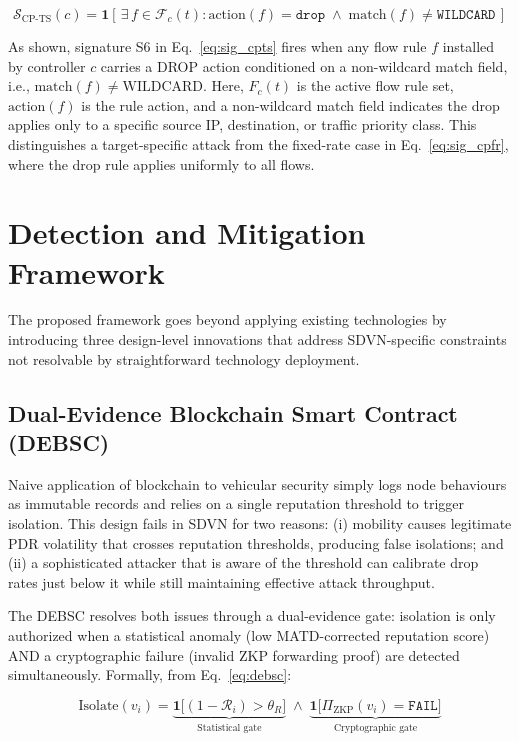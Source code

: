 \documentclass[12pt, a4paper]{report}
\begin{document}
\begin{equation}
\label{eq:sig_cpts}
\mathcal{S}_{\text{CP-TS}}(c) =
\mathbf{1}\!\left[\,
\exists\,f \in \mathcal{F}_c(t) :
\mathrm{action}(f) = \texttt{drop} \;\wedge\;
\mathrm{match}(f) \neq \texttt{WILDCARD}
\,\right]
\end{equation}

As shown, signature S6 in Eq.~\eqref{eq:sig_cpts} fires when any flow rule $f$ installed by controller $c$ carries a DROP action conditioned on a non-wildcard match field, i.e., $\text{match}(f) \neq \text{WILDCARD}$. Here, $F_c(t)$ is the active flow rule set, $\text{action}(f)$ is the rule action, and a non-wildcard match field indicates the drop applies only to a specific source IP, destination, or traffic priority class. This distinguishes a target-specific attack from the fixed-rate case in Eq.~\eqref{eq:sig_cpfr}, where the drop rule applies uniformly to all flows.

\section{Detection and Mitigation Framework}
\label{sec:design}

The proposed framework goes beyond applying existing technologies by
introducing three design-level innovations that address SDVN-specific
constraints not resolvable by straightforward technology deployment.

\subsection{Dual-Evidence Blockchain Smart Contract (DEBSC)}

Naive application of blockchain to vehicular security simply logs node
behaviours as immutable records and relies on a single reputation
threshold to trigger isolation. This design fails in SDVN for two
reasons: (i) mobility causes legitimate PDR volatility that crosses
reputation thresholds, producing false isolations; and (ii) a
sophisticated attacker that is aware of the threshold can calibrate
drop rates just below it while still maintaining effective attack
throughput.

The DEBSC resolves both issues through a dual-evidence gate: isolation
is only authorized when a statistical anomaly (low MATD-corrected
reputation score) AND a cryptographic failure (invalid ZKP forwarding
proof) are detected simultaneously. Formally, from Eq.~\eqref{eq:debsc}:

\begin{equation}
\label{eq:debsc_design}
\mathrm{Isolate}(v_i) = \underbrace{\mathbf{1}\bigl[(1-\mathcal{R}_i) > \theta_R\bigr]}_{\text{Statistical gate}}
\;\wedge\;
\underbrace{\mathbf{1}\bigl[\Pi_{\mathrm{ZKP}}(v_i) = \texttt{FAIL}\bigr]}_{\text{Cryptographic gate}}
\end{equation}
\end{document}
